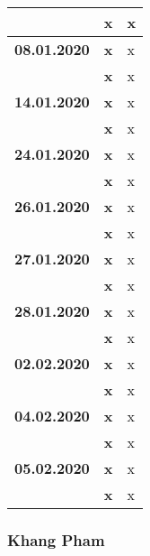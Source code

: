 {\begin{longtable}{|l|l|p{11cm}|}
			& \textbf{\hfill x} & x
		\\ \hline \textbf{08.01.2020}
			& \textbf{\hfill x} & x \\\cline{2-3}
			& \textbf{\hfill x} & x
		\\ \hline \textbf{14.01.2020}
			& \textbf{\hfill x} & x \\\cline{2-3}
			& \textbf{\hfill x} & x
		\\ \hline \textbf{24.01.2020}
			& \textbf{\hfill x} & x \\\cline{2-3}
			& \textbf{\hfill x} & x
		\\ \hline \textbf{26.01.2020}
			& \textbf{\hfill x} & x \\\cline{2-3}
			& \textbf{\hfill x} & x
		\\ \hline \textbf{27.01.2020}
			& \textbf{\hfill x} & x \\\cline{2-3}
			& \textbf{\hfill x} & x
		\\ \hline \textbf{28.01.2020}
			& \textbf{\hfill x} & x \\\cline{2-3}
			& \textbf{\hfill x} & x
		\\ \hline \textbf{02.02.2020}
			& \textbf{\hfill x} & x \\\cline{2-3}
			& \textbf{\hfill x} & x
		\\ \hline \textbf{04.02.2020}
			& \textbf{\hfill x} & x \\\cline{2-3}
			& \textbf{\hfill x} & x
		\\ \hline \textbf{05.02.2020}
			& \textbf{\hfill x} & x \\\cline{2-3}
			& \textbf{\hfill x} & x \\
		\hline\hline
	\end{longtable}
}

\clearpage

\subsubsection{Khang Pham}

